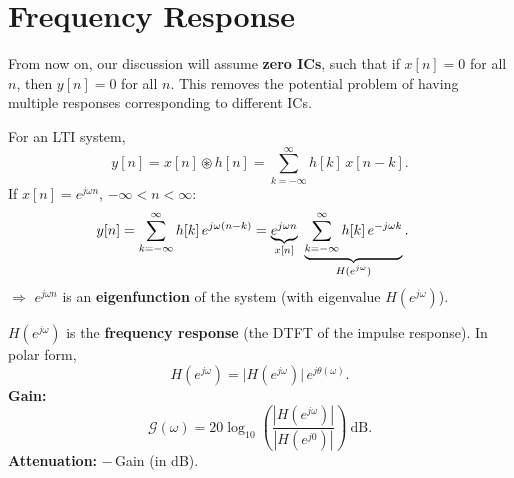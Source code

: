 \documentclass[handout_subfiles_root.tex]{subfiles}
\begin{document}
\section{Frequency Response}

\begin{center}
\end{center}

\begin{notebox}[title={Note}]
From now on, our discussion will assume \textbf{zero ICs}, such that if $x[n]=0$ for all $n$, then $y[n]=0$ for all $n$.
This removes the potential problem of having multiple responses corresponding to different ICs.
\end{notebox}

\noindent{}For an LTI system,
\begin{equation*}
y[n] = x[n]\circledast h[n] = \sum_{k=-\infty}^{\infty} h[k]\,x[n-k].
\end{equation*}
If $x[n] = e^{j\omega n}$, $-\infty<n<\infty$:
\begin{align*}
y[n] &= \sum_{k=-\infty}^{\infty} h[k]\,e^{j\omega(n-k)}
= \underbrace{e^{j\omega n}}_{\HandoutUnderbraceLabel{x[n]}}\ \underbrace{\sum_{k=-\infty}^{\infty} h[k]\,e^{-j\omega k}}_{\HandoutUnderbraceLabel{H(e^{j\omega})}}.
\end{align*}
$\Rightarrow$ $e^{j\omega n}$ is an \textbf{eigenfunction} of the system (with eigenvalue $H(e^{j\omega})$).

\begin{defbox}[title={Frequency Response}]
$H(e^{j\omega})$ is the \textbf{frequency response} (the DTFT of the impulse response). In polar form,
\begin{equation*}
H(e^{j\omega}) = \big|H(e^{j\omega})\big|\,e^{j\theta(\omega)}.
\end{equation*}
\textbf{Gain:}\footnotemark{}
\begin{equation*}
\mathcal{G}(\omega) = 20\log_{10}\!\left(\frac{|H(e^{j\omega})|}{|H(e^{j0})|}\right)\ \mathrm{dB}.
\end{equation*}
\textbf{Attenuation:} $-\,$Gain (in dB).
\end{defbox}
\end{document}
